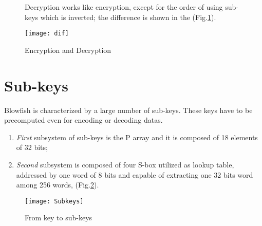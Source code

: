 \begin{figure}[!h]
Decryption works like encryption, except for the order of using sub-keys which is inverted; the difference is shown in the (Fig.\ref{Fig:dif}).
\begin{center}
\texttt{[image: dif]}
\caption{Encryption and Decryption}
\label{Fig:dif}
\end{center}
\end{figure}
\vspace{-15mm}
\section{Sub-keys}
Blowfish is characterized by a large number of sub-keys. These keys have to be precomputed even for encoding or decoding datas.
 \begin{enumerate}
 \item \textit{First} subsystem of sub-keys is the P array and it is composed of 18 elements of 32 bits;
 \item \textit{Second} subsystem is composed of four S-box utilized as lookup table, addressed by one word of 8 bits and capable of extracting one 32 bits word among 256 words, (Fig.\ref{Fig:Subkeys}).
  \end{enumerate}
  
 \begin{figure}[!h]
 \begin{center}
 \texttt{[image: Subkeys]}
 \caption{From key to sub-keys}
 \label{Fig:Subkeys}
 \end{center}
 \end{figure}

